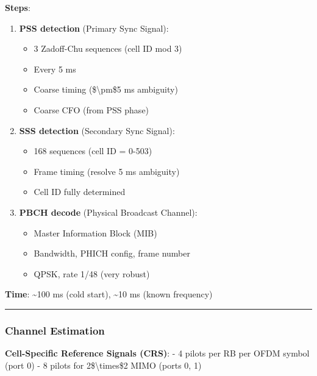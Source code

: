 \textbf{Steps}:

\begin{enumerate}
\def\labelenumi{\arabic{enumi}.}
\tightlist
\item
  \textbf{PSS detection} (Primary Sync Signal):

  \begin{itemize}
  \tightlist
  \item
    3 Zadoff-Chu sequences (cell ID mod 3)
  \item
    Every 5 ms
  \item
    Coarse timing (\$\textbackslash pm\$5 ms ambiguity)
  \item
    Coarse CFO (from PSS phase)
  \end{itemize}
\item
  \textbf{SSS detection} (Secondary Sync Signal):

  \begin{itemize}
  \tightlist
  \item
    168 sequences (cell ID = 0-503)
  \item
    Frame timing (resolve 5 ms ambiguity)
  \item
    Cell ID fully determined
  \end{itemize}
\item
  \textbf{PBCH decode} (Physical Broadcast Channel):

  \begin{itemize}
  \tightlist
  \item
    Master Information Block (MIB)
  \item
    Bandwidth, PHICH config, frame number
  \item
    QPSK, rate 1/48 (very robust)
  \end{itemize}
\end{enumerate}

\textbf{Time}: \textasciitilde100 ms (cold start), \textasciitilde10 ms
(known frequency)

\begin{center}\rule{0.5\linewidth}{0.5pt}\end{center}

\subsubsection{Channel Estimation}\label{channel-estimation}

\textbf{Cell-Specific Reference Signals (CRS)}: - 4 pilots per RB per
OFDM symbol (port 0) - 8 pilots for 2\$\textbackslash times\$2 MIMO
(ports 0, 1)

